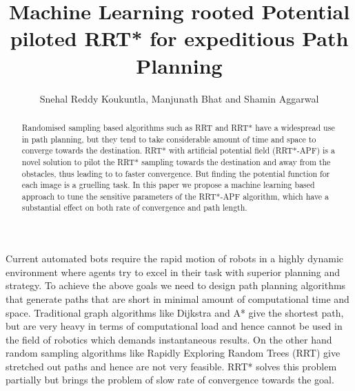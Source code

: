 \documentclass[runningheads]{llncs}
\begin{document}
%
\title{Machine Learning rooted Potential piloted RRT* for expeditious Path Planning}
%
%
\author{
Snehal Reddy Koukuntla\inst{*}, Manjunath Bhat\inst{*} and Shamin Aggarwal\inst{*}}
%
%
%
\maketitle              %
%
\begin{abstract}
Randomised sampling based algorithms such as RRT and RRT* have a widespread use in path planning, but they tend to take considerable amount of time and space to converge towards the destination. RRT* with artificial potential field (RRT*-APF) is a novel solution to pilot the RRT* sampling towards the destination and away from the obstacles, thus leading to to faster convergence. But finding the potential function for each image is a gruelling task. In this paper we propose a machine learning based approach to tune the sensitive parameters of the RRT*-APF algorithm, which have a substantial effect on both rate of convergence and path length. 

\end{abstract}
%
%
%
\section{}
Current automated bots require the rapid motion of robots in a highly dynamic environment where agents try to excel in their task with superior planning and strategy. To achieve the above goals we need to design path planning algorithms that generate paths that are short in minimal amount of computational time and space. Traditional graph algorithms like Dijkstra and A* give the shortest path, but are very heavy in terms of computational load and hence cannot be used in the field of robotics which demands instantaneous results. On the other hand random sampling algorithms like Rapidly Exploring Random Trees (RRT) give stretched out paths and hence are not very feasible. RRT* solves this problem partially but brings the problem of slow rate of convergence towards the goal. 
\end{document}
